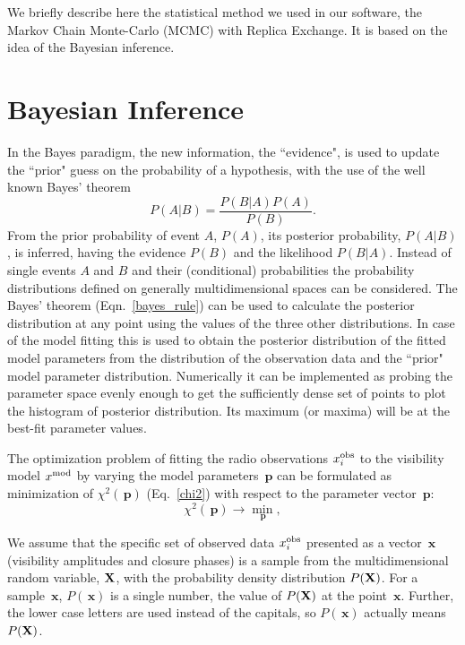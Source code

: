 \documentclass[preprint2]{aastex}
\newcommand{\bfp}{\,\mathbf{p}}
\newcommand{\bfx}{\,\mathbf{x}}
\begin{document}
We briefly describe here the statistical method we used in our software, the Markov Chain Monte-Carlo (MCMC) with Replica Exchange. It is based on the idea of the Bayesian inference. 



\section{Bayesian Inference}\label{bayesian}

In the Bayes paradigm, the new information, the ``evidence", is used to update the ``prior" guess on the probability of a hypothesis, with the use of the well known Bayes' theorem
\begin{equation}
  \label{bayes_rule}
  P(A|B) =  \frac{P(B|A)P(A)}{P(B)}.
\end{equation}
From the prior probability of event $A$, $P(A)$, its posterior probability, $P(A|B)$, is inferred, having the evidence $P(B)$ and the likelihood $P(B|A)$. Instead of single events $A$ and $B$ and their (conditional) probabilities the probability distributions defined on generally multidimensional spaces can be considered. The Bayes' theorem (Eqn.~\eqref{bayes_rule}) can be used to calculate the posterior distribution at any point using the values of the three other distributions. In case of the model fitting this is used to obtain the posterior distribution of the fitted model parameters from the distribution of the observation data and the ``prior" model parameter distribution. Numerically it can be implemented as  probing the parameter space evenly enough to get the sufficiently dense set of points to plot the histogram of posterior distribution. Its maximum (or maxima) will be at the best-fit parameter values.

The optimization problem of fitting the radio observations $x_i^{\rm obs}$ to the visibility model $x^{\rm mod}$ by varying the model parameters $\bfp$ can be formulated as minimization of $\chi^2(\bfp)$ (Eq.~\eqref{chi2}) with respect to the parameter vector $\bfp$:
\begin{equation*}
  \label{chi2_nonumber}
  \chi^2(\bfp) \rightarrow {\min\limits_{\bfp}},
\end{equation*}

We assume that the specific set of observed data $x_i^{\rm obs}$ presented as a vector $\bfx$ (visibility amplitudes and closure phases) is a sample from the multidimensional random variable, ${\bf X}$, with the probability density distribution $P({\bf X})$. For a sample $\bfx$, $P(\bfx)$ is a single number, the value of $P({\bf X})$ at the point $\bfx$. Further, the lower case letters are used instead of the capitals, so $P(\bfx)$ actually means $P({\bf X})$.
\end{document}
